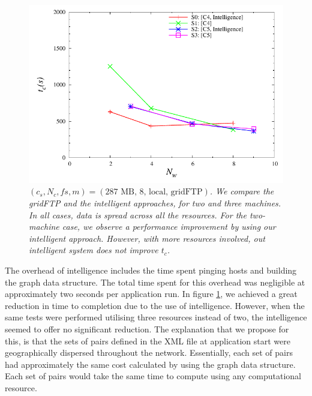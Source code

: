 \documentclass{rspublic}
\newcommand{\micnote}[1]{ {\textcolor{blue} { ***Michael: #1 }}}
\newcommand{\betynote}[1]{ {\textcolor{orange} { ***Bety: #1 }}}
\newcommand{\jhanote}[1]{} \newcommand{\micnote}[1]{}\newcommand{\betynote}[1]{} \newcommand{\fixme}[1]{}
\begin{document}
\begin{figure}[!ht]
\begin{center}
   \includegraphics[scale=0.5] {data/graphs/IntelligentFigure}
\end{center}
\caption{\textit{$(c_s, N_c, fs, m)=(\mbox{287 MB, 8, local, gridFTP})$.
We compare the gridFTP and the intelligent approaches, for two and three
machines. In all cases, data is spread across all the resources.  For
the two-machine case, we observe a performance improvement by using our
intelligent approach. However, with more resources involved, out
intelligent system does not improve $t_c$.}}
\label{Fig:IntelligentExp}
\end{figure}


The overhead of intelligence includes the time spent pinging hosts and
building the graph data structure. The total time spent for this
overhead was negligible at approximately two seconds per application
run. In figure \ref{Fig:IntelligentExp}, we achieved a great reduction
in time to completion due to the use of intelligence.  However, when the
same tests were performed utilising three resources instead of two, the
intelligence seemed to offer no significant reduction. The explanation
that we propose for this, is that the sets of pairs defined in the XML
file at application start were geographically dispersed throughout the
network.  Essentially, each set of pairs had approximately the same cost
calculated by using the graph data structure. Each set of pairs would
take the same time to compute using any computational resource.
\jhanote{Perhaps define a test to verify this, so a note can go in
saying we investigated this}
\end{document}
